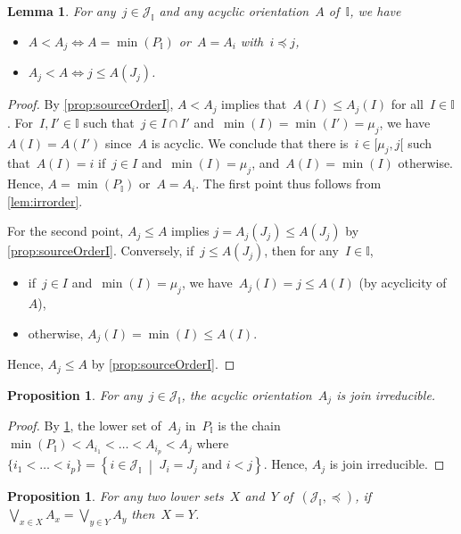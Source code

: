 \documentclass[reqno]{amsart}
\newtheorem{proposition}[theorem]{Proposition}
\newtheorem{lemma}[theorem]{Lemma}
\theoremstyle{definition}
\newcommand{\cal}[1]{\mathcal{#1}} %
\newcommand{\set}[2]{\left\{ #1 \;\middle|\; #2 \right\}} %
\newcommand{\bigJoin}{\bigvee} %
\newcommand{\II}{\mathbb I} %
\newcommand{\cJ}{\cal{J}} %
\begin{document}
\begin{lemma}
\label{lem:subirr}
For any~$j \in \cJ_\II$ and any acyclic orientation~$A$ of~$\II$, we have
\begin{itemize}
\item $A < A_j \iff A = \min(P_\II)$ or~$A = A_i$ with~$i \preccurlyeq j$,
\item $A_j < A \iff j \le A(J_j)$.
\end{itemize}
\end{lemma}

\begin{proof}
By \cref{prop:sourceOrderI}, $A < A_j$ implies that~$A(I) \le A_j(I)$ for all~$I \in \II$.
For~$I, I' \in \II$ such that~$j \in I \cap I'$ and~$\min(I) = \min(I') = \mu_j$, we have~$A(I) = A(I')$ since~$A$ is acyclic.
We conclude that there is~$i \in {[\mu_j, j[}$ such that~$A(I) = i$ if~$j \in I$ and~$\min(I) = \mu_j$, and~$A(I) = \min(I)$ otherwise.
Hence, $A = \min(P_\II)$ or~$A = A_i$.
The first point thus follows from \cref{lem:irrorder}.

For the second point, $A_j \le A$ implies $j = A_j(J_j) \le A(J_j)$ by \cref{prop:sourceOrderI}.
Conversely, if~$j \le A(J_j)$, then for any~$I \in \II$,
\begin{itemize}
\item if~$j \in I$ and~$\min(I) = \mu_j$, we have~$A_j(I) = j \le A(I)$ (by acyclicity of~$A$),
\item otherwise, $A_j(I) = \min(I) \le A(I)$.
\end{itemize}
Hence, $A_j \le A$ by \cref{prop:sourceOrderI}.
\end{proof}

\begin{proposition}
\label{prop:irrOj}
For any~$j\in \cJ_\II$, the acyclic orientation~$A_j$ is join irreducible.
\end{proposition}

\begin{proof}
By \cref{lem:subirr}, the lower set of~$A_j$ in~$P_\II$ is the chain $\min(P_\II) < A_{i_1} < \dots < A_{i_p} < A_j$ where~$\{i_1 < \dots < i_p\} = \set{i \in \cJ_\II}{J_i = J_j \text{ and } i < j}$.
Hence, $A_j$ is join irreducible.
\end{proof}

\begin{proposition}
For any two lower sets~$X$ and~$Y$ of~$(\cJ_\II, \preccurlyeq)$, if~$\bigJoin\limits_{x \in X} A_x = \bigJoin\limits_{y \in Y} A_y$ then~$X = Y$.
\end{proposition}
\end{document}
